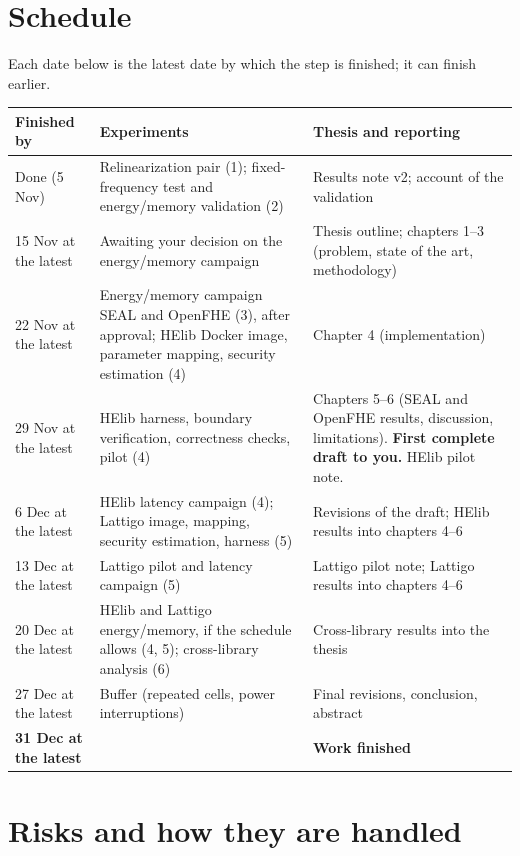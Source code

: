 \documentclass[11pt]{article}
\begin{document}
\section{Schedule}

Each date below is the latest date by which the step is finished; it can finish earlier.

\begin{center}\footnotesize
\begin{tabular}{@{}L{2.6cm}L{8.0cm}L{5.4cm}@{}}
\toprule
\textbf{Finished by} & \textbf{Experiments} & \textbf{Thesis and reporting} \\
\midrule
Done (5 Nov) & Relinearization pair (1); fixed-frequency test and energy/memory validation (2) & Results note v2; account of the validation \\
15 Nov at the latest & Awaiting your decision on the energy/memory campaign & Thesis outline; chapters 1--3 (problem, state of the art, methodology) \\
22 Nov at the latest & Energy/memory campaign SEAL and OpenFHE (3), after approval; HElib Docker image, parameter mapping, security estimation (4) & Chapter 4 (implementation) \\
29 Nov at the latest & HElib harness, boundary verification, correctness checks, pilot (4) & Chapters 5--6 (SEAL and OpenFHE results, discussion, limitations). \textbf{First complete draft to you.} HElib pilot note. \\
6 Dec at the latest & HElib latency campaign (4); Lattigo image, mapping, security estimation, harness (5) & Revisions of the draft; HElib results into chapters 4--6 \\
13 Dec at the latest & Lattigo pilot and latency campaign (5) & Lattigo pilot note; Lattigo results into chapters 4--6 \\
20 Dec at the latest & HElib and Lattigo energy/memory, if the schedule allows (4, 5); cross-library analysis (6) & Cross-library results into the thesis \\
27 Dec at the latest & Buffer (repeated cells, power interruptions) & Final revisions, conclusion, abstract \\
\textbf{31 Dec at the latest} & & \textbf{Work finished} \\
\bottomrule
\end{tabular}
\end{center}

\section{Risks and how they are handled}
\end{document}

